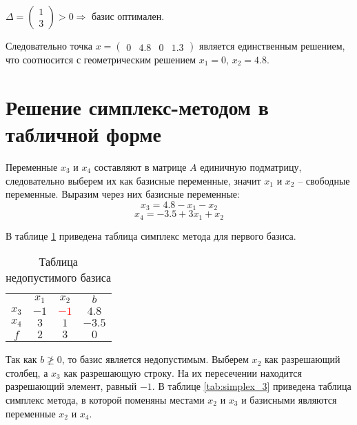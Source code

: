 \begin{enumerate}
$\Delta = 
\begin{pmatrix}
	1 \\
	3
\end{pmatrix} > 0 \Rightarrow$ базис оптимален. 

Следовательно точка $x = \begin{pmatrix} 0 & 4.8 & 0 & 1.3 \end{pmatrix}$ является единственным решением, что соотносится с геометрическим решением $x_1 = 0$, $x_2 = 4.8$.

\end{enumerate}

\newpage

\section{Решение симплекс-методом в табличной форме}

Переменные $x_3$ и $x_4$ составляют в матрице $A$ единичную подматрицу, следовательно выберем их как базисные переменные, значит $x_1$ и $x_2$ -- свободные переменные. Выразим через них базисные переменные:
\begin{equation*}
x_3 = 4.8 - x_1 - x_2
\end{equation*}
\begin{equation*}
x_4 = -3.5 + 3x_1 + x_2
\end{equation*}

В таблице \ref{tab:simplex_1} приведена таблица симплекс метода для первого базиса.

\begin{table}[H]
\begin{center}
	\def\tabcolsep{15pt}
	\def\arraystretch{1.3}
	\caption{Таблица недопустимого базиса}
	\label{tab:simplex_1}
	\begin{tabular}{|c||c|c||c|}
		\hline
		 & $x_1$ & $x_2$ & $b$ \\ 
		\hhline{|=#==#=|}
		$x_3$ & $-1$ & \textcolor{red}{\boldmath$-1$} & $4.8$ \\ 
		\hline
		$x_4$ & $3$ & $1$ & $-3.5$ \\ 
		\hhline{|=#==#=|}
		$f$ & $2$ & $3$ & $0$ \\ 
		\hline
	\end{tabular}
\end{center}
\end{table}

Так как $b \ngeq 0$, то базис является недопустимым. Выберем $x_2$ как разрешающий столбец, а $x_3$ как разрешающую строку. На их пересечении находится разрешающий элемент, равный $-1$. В таблице \ref{tab:simplex_3} приведена таблица симплекс метода, в которой поменяны местами $x_2$ и $x_3$ и базисными являются переменные $x_2$ и $x_4$.

